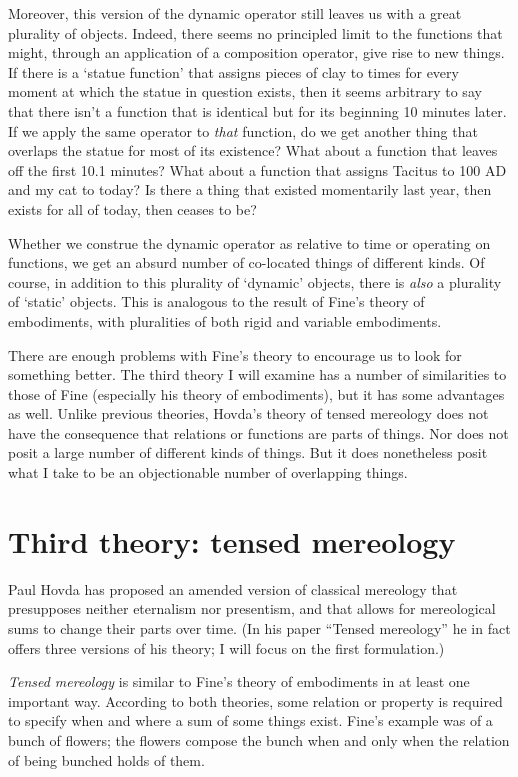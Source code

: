 \documentclass[11pt]{article}
\begin{document}
\begin{spacing}{1.5}
Moreover, this version of the dynamic operator still leaves us with a
great plurality of objects.  Indeed, there seems no principled limit
to the functions that might, through an application of a composition
operator, give rise to new things.  If there is a `statue function'
that assigns pieces of clay to times for every moment at which the
statue in question exists, then it seems arbitrary to say that there
isn't a function that is identical but for its beginning 10 minutes
later.  If we apply the same operator to {\em that} function, do we
get another thing that overlaps the statue for most of its existence?
What about a function that leaves off the first 10.1 minutes?  What
about a function that assigns Tacitus to 100 AD and my cat to today?
Is there a thing that existed momentarily last year, then exists for
all of today, then ceases to be?

Whether we construe the dynamic operator as relative to time or
operating on functions, we get an absurd number of co-located things
of different kinds.  Of course, in addition to this plurality of
`dynamic' objects, there is {\em also} a plurality of `static'
objects.  This is analogous to the result of Fine's theory of
embodiments, with pluralities of both rigid and variable embodiments.

There are enough problems with Fine's theory to encourage us to look
for something better.  The third theory I will examine has a number of
similarities to those of Fine (especially his theory of embodiments),
but it has some advantages as well.  Unlike previous theories, Hovda's
theory of tensed mereology does not have the consequence that
relations or functions are parts of things.  Nor does not posit a
large number of different kinds of things.  But it does nonetheless
posit what I take to be an objectionable number of overlapping things.

\section{Third theory: tensed mereology}
\label{hovda}
Paul Hovda has proposed an amended version of classical mereology that
presupposes neither eternalism nor presentism, and that allows for
mereological sums to change their parts over time.  (In his paper
``Tensed mereology'' \citeyearpar{hovda2011} he in fact offers three
versions of his theory; I will focus on the first formulation.)

{\em Tensed mereology} is similar to Fine's theory of embodiments in
at least one important way.  According to both theories, some relation
or property is required to specify when and where a sum of some things
exist.  Fine's example was of a bunch of flowers; the flowers compose
the bunch when and only when the relation of being bunched holds of
them.


\end{spacing}
\end{document}
